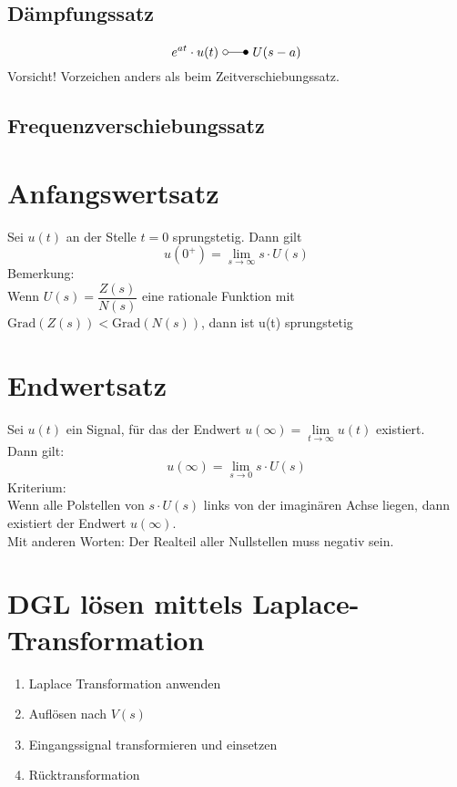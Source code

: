 \subsection{Dämpfungssatz}
\[ 
    e^{at} \cdot u(t) ~ \laplace ~ U(s - a) 
\]
Vorsicht! Vorzeichen anders als beim Zeitverschiebungssatz.

\subsection{Frequenzverschiebungssatz}



\section{Anfangswertsatz}
Sei $u(t)$ an der Stelle $t = 0$ sprungstetig. Dann gilt
\[ 
    u(0^+) = \lim\limits_{s \to \infty} s \cdot U(s) 
\]
Bemerkung: \\
Wenn $U(s) = \dfrac{Z(s)}{N(s)}$ eine rationale Funktion mit
$\text{Grad}(Z(s)) < \text{Grad}(N(s))$, dann ist u(t) sprungstetig

\section{Endwertsatz }
Sei $u(t)$ ein Signal, für das der Endwert
$u(\infty) = \lim\limits_{t \to \infty} u(t)$ existiert. \\
Dann gilt:
\[ 
u(\infty) = \lim\limits_{s \to 0} s \cdot U(s) 
\]
Kriterium: \\
Wenn alle Polstellen von $s \cdot U(s)$ links von der imaginären Achse liegen,
dann existiert der Endwert $u(\infty)$. \\
Mit anderen Worten: Der Realteil aller Nullstellen muss negativ sein.

\section{DGL lösen mittels Laplace-Transformation}
\begin{enumerate}
    \item Laplace Transformation anwenden
    \item Auflösen nach $V(s)$
    \item Eingangssignal transformieren und einsetzen
    \item Rücktransformation
\end{enumerate}


